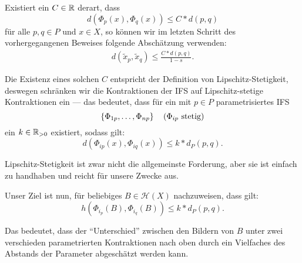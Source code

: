 \documentclass[afourpaper]{tufte-handout}
\begin{document}
Existiert ein \( C \in \mathbb{R} \) derart, dass
\begin{equation*}
  d(\Phi_p(x), \Phi_q(x)) \leq C * d(p,q)
\end{equation*}
für alle \( p,q \in P \) und \( x \in X \), so können wir im letzten Schritt des vorhergegangenen Beweises folgende Abschätzung verwenden:
\begin{align*}
  d(\widetilde{x}_p, \widetilde{x}_q) \leq \frac{C * d(p,q)}{1-s}\text{.}
\end{align*}

Die Existenz eines solchen \( C \) entspricht der Definition von Lipschitz-Stetigkeit, deswegen schränken wir die Kontraktionen der IFS auf Lipschitz-stetige Kontraktionen ein --- das bedeutet, dass für ein mit \( p \in P \) parametrisiertes IFS
\begin{equation*}
  \left \{ \Phi_{1p},\dots,\Phi_{np} \right \} \quad \text{(\( \Phi_{ip} \) stetig)}
\end{equation*}
ein \( k \in \mathbb{R}_{> 0} \) existiert, sodass gilt:
\begin{equation*}
  d(\Phi_{ip}(x), \Phi_{iq}(x)) \leq k * d_P(p,q)\text{.}
\end{equation*}

Lipschitz-Stetigkeit ist zwar nicht die allgemeinste Forderung, aber sie ist einfach zu handhaben und reicht für unsere Zwecke aus.

Unser Ziel ist nun, für beliebiges \( B \in \mathcal{H}(X) \) nachzuweisen, dass gilt:
\begin{equation*}
  h(\Phi_{i_p}(B), \Phi_{i_q}(B)) \leq k * d_P(p,q)\text{.}
\end{equation*}

Das bedeutet, dass der ``Unterschied'' zwischen den Bildern von \( B \) unter zwei verschieden parametrierten Kontraktionen nach oben durch ein Vielfaches des Abstands der Parameter abgeschätzt werden kann.
\end{document}
